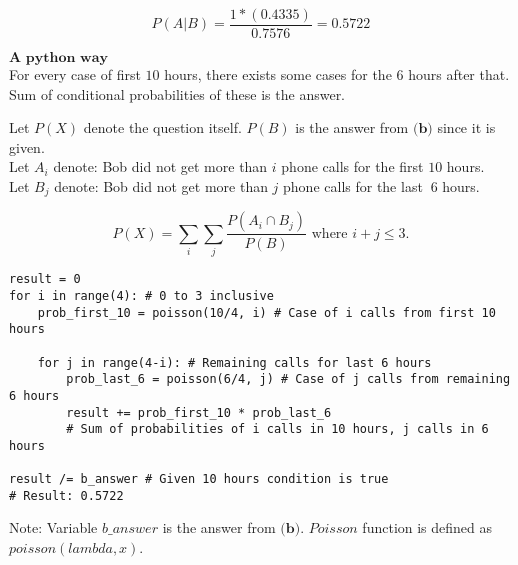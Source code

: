 \documentclass[12pt]{article}
\begin{document}
$$P(A|B) = \frac{1*(0.4335)}{0.7576} = 0.5722$$


$\textbf{A python way}$ \\

For every case of first $10$ hours, there exists some cases for the $6$ hours after that. Sum of conditional probabilities of these is the answer.

\begin{center}
    Let $P(X)$ denote the question itself. $P(B)$ is the answer from $\textbf{(b)}$ since it is given.\\
    Let $A_i$ denote: Bob did not get more than $i$ phone calls for the first $10$ hours. \\
    Let $B_j$ denote: Bob did not get more than $j$ phone calls for the last $\ 6$ hours.
\end{center}

$$P(X) = \sum_{i}\sum_{j}\frac{P(A_i\cap B_j)}{P(B)}\text{ where } i+j \leq 3.$$

\begin{lstlisting}
result = 0
for i in range(4): # 0 to 3 inclusive
    prob_first_10 = poisson(10/4, i) # Case of i calls from first 10 hours

    for j in range(4-i): # Remaining calls for last 6 hours
        prob_last_6 = poisson(6/4, j) # Case of j calls from remaining 6 hours
        result += prob_first_10 * prob_last_6
        # Sum of probabilities of i calls in 10 hours, j calls in 6 hours

result /= b_answer # Given 10 hours condition is true
# Result: 0.5722
\end{lstlisting}
Note: Variable $b\_answer$ is the answer from $\textbf{(b)}$. $Poisson$ function is defined as $poisson(lambda, x)$.
\end{document}
